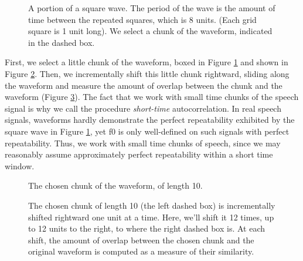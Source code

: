 \documentclass[12pt]{article}
\begin{document}
\begin{figure}
  \centering
  \caption{A portion of a square wave. The period of the wave
  is the amount of time between the repeated squares, which is 8
  units. (Each grid square is 1 unit long). We select a chunk of the
  waveform, indicated in the dashed box.}
  \label{fig:square}
\end{figure}

First, we select a little chunk of the waveform, boxed in Figure
\ref{fig:square} and shown in Figure \ref{fig:square-windowed}. Then,
we incrementally shift this little chunk rightward, sliding along the
waveform and measure the amount of overlap between the chunk and the
waveform (Figure \ref{fig:square-shift}).  The fact that we work with
small time chunks of the speech signal is why we call the procedure
\textit{short-time} autocorrelation. In real speech signals, waveforms
hardly demonstrate the perfect repeatability exhibited by the square
wave in Figure \ref{fig:square}, yet f0 is only well-defined on such
signals with perfect repeatability. Thus, we work with small time
chunks of speech, since we may reasonably assume approximately perfect
repeatability within a short time window.

\begin{figure}
  \centering
  \caption{The chosen chunk of the waveform, of length 10.}
  \label{fig:square-windowed}
\end{figure}

\begin{figure}
  \centering
  \caption{The chosen chunk of length 10 (the left dashed box) is incrementally shifted
    rightward one unit at a time. Here, we'll shift it 12 times, up to 12 units
    to the right, to where the right dashed box is. At each shift, the
    amount of overlap between the chosen chunk and the original
    waveform is computed as a measure of their similarity.} 
  \label{fig:square-shift}
\end{figure}
\end{document}

